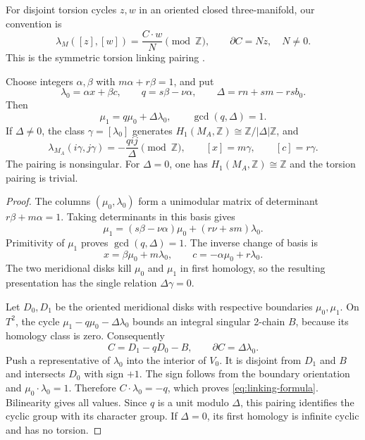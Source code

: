For disjoint torsion cycles $z,w$ in an oriented closed three-manifold,
our convention is
\[
 \lambda_M([z],[w])=\frac{C\cdot w}{N}\pmod{\mathbb Z},
             \qquad \partial C=Nz,\quad N\ne0.
\]
This is the symmetric torsion linking pairing
\cite[Section~1, pp.~2--3]{Hillman}.

\begin{theorem}\label{thm:linking}
Choose integers $\alpha,\beta$ with $m\alpha+r\beta=1$, and put
\begin{equation}\label{eq:linking-coordinates}
 \lambda_0=\alpha x+\beta c,\qquad
 q=s\beta-\nu\alpha,\qquad \Delta=rn+sm-rsb_0.
\end{equation}
Then
\[
       \mu_1=q\mu_0+\Delta\lambda_0,\qquad
       \gcd(q,\Delta)=1.
\]
If $\Delta\ne0$, the class $\gamma=[\lambda_0]$ generates
$H_1(M_A,\mathbb Z)\cong\mathbb Z/|\Delta|\mathbb Z$, and
\begin{equation}\label{eq:linking-formula}
 \lambda_{M_A}(i\gamma,j\gamma)=-\frac{qij}{\Delta}
            \pmod{\mathbb Z},\qquad
 [x]=m\gamma,\qquad[c]=r\gamma.
\end{equation}
The pairing is nonsingular.  For $\Delta=0$, one has
$H_1(M_A,\mathbb Z)\cong\mathbb Z$ and the torsion pairing is trivial.
\end{theorem}

\begin{proof}
The columns $(\mu_0,\lambda_0)$ form a unimodular matrix of determinant
$r\beta+m\alpha=1$.  Taking determinants in this basis gives
\[
 \mu_1=(s\beta-\nu\alpha)\mu_0+(r\nu+sm)\lambda_0.
\]
Primitivity of $\mu_1$ proves $\gcd(q,\Delta)=1$.
The inverse change of basis is
\[
               x=\beta\mu_0+m\lambda_0,\qquad
               c=-\alpha\mu_0+r\lambda_0.
\]
The two meridional disks kill $\mu_0$ and $\mu_1$ in first homology,
so the resulting presentation has the single relation $\Delta\gamma=0$.

Let $D_0,D_1$ be the oriented meridional disks with respective
boundaries $\mu_0,\mu_1$.  On $T^2$, the cycle
$\mu_1-q\mu_0-\Delta\lambda_0$ bounds an integral singular
2-chain $B$, because its homology class is zero.  Consequently
\[
                   C=D_1-qD_0-B,\qquad
                   \partial C=\Delta\lambda_0.
\]
Push a representative of $\lambda_0$ into the interior of $V_0$.
It is disjoint from $D_1$ and $B$ and intersects $D_0$ with sign $+1$.
The sign follows from the boundary orientation and
$\mu_0\cdot\lambda_0=1$.  Therefore $C\cdot\lambda_0=-q$,
which proves \eqref{eq:linking-formula}.  Bilinearity gives all values.
Since $q$ is a unit modulo $\Delta$, this pairing identifies the cyclic
group with its character group.  If $\Delta=0$, its first homology
is infinite cyclic and has no torsion.
\end{proof}

